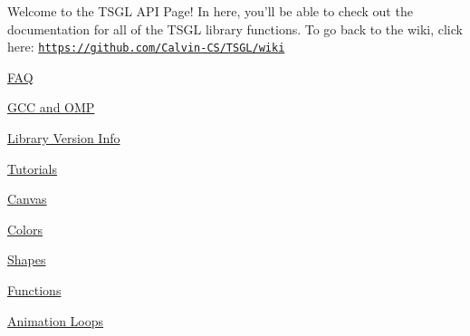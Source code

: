 Welcome to the T\-S\-G\-L A\-P\-I Page! In here, you'll be able to check out the documentation for all of the T\-S\-G\-L library functions. To go back to the wiki, click here\-: \href{https://github.com/Calvin-CS/TSGL/wiki}{\tt https\-://github.\-com/\-Calvin-\/\-C\-S/\-T\-S\-G\-L/wiki}
\begin{DoxyItemize}
\item \hyperlink{md__home_cpd5_workspace__t_s_g_l_docs-wiki__f_a_q}{F\-A\-Q}
\item \hyperlink{md__home_cpd5_workspace__t_s_g_l_docs-wiki__g_c_c-and-_o_m_p}{G\-C\-C and O\-M\-P}
\item \hyperlink{md__home_cpd5_workspace__t_s_g_l_docs-wiki__library-_versions}{Library Version Info}
\item \hyperlink{md__home_cpd5_workspace__t_s_g_l_docs-wiki__using-_canvas}{Tutorials}
\begin{DoxyItemize}
\item \hyperlink{md__home_cpd5_workspace__t_s_g_l_docs-wiki__using-_canvas}{Canvas}
\item \hyperlink{md__home_cpd5_workspace__t_s_g_l_docs-wiki_tutorials__using-_colors}{Colors}
\item \hyperlink{md__home_cpd5_workspace__t_s_g_l_docs-wiki_tutorials__using-_shapes}{Shapes}
\item \hyperlink{md__home_cpd5_workspace__t_s_g_l_docs-wiki_tutorials__using-_functions}{Functions}
\item \hyperlink{md__home_cpd5_workspace__t_s_g_l_docs-wiki__animation-_loops}{Animation Loops}
\end{DoxyItemize}
\end{DoxyItemize}